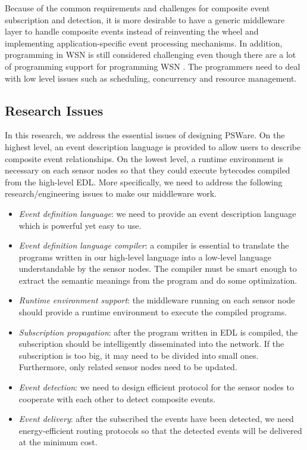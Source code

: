 Because of the common requirements and challenges for composite event subscription and detection, it is more desirable to have a generic middleware layer to handle composite events instead of reinventing the wheel and implementing application-specific event processing mechanisms. In addition, programming in WSN is still considered challenging even though there are a lot of programming support for programming WSN \cite{nesc}. The programmers need to deal with low level issues such as scheduling, concurrency and resource management. 

\subsection{Research Issues}
In this research, we address the essential issues of designing PSWare. On the highest level, an event description language is provided to allow users to describe composite event relationships. On the lowest level, a runtime environment is necessary on each sensor nodes so that they could execute bytecodes compiled from the high-level EDL. More specifically, we need to address the following research/engineering issues to make our middleware work.

\begin{itemize}
\item	\emph{Event definition language}: we need to provide an event description language which is powerful yet easy to use.
\item	\emph{Event definition language compiler}: a compiler is essential to translate the programs written in our high-level language into a low-level language understandable by the sensor nodes. The compiler must be smart enough to extract the semantic meanings from the program and do some optimization.
\item	\emph{Runtime environment support}: the middleware running on each sensor node should provide a runtime environment to execute the compiled programs.
\item	\emph{Subscription propagation}: after the program written in EDL is compiled, the subscription should be intelligently disseminated into the network. If the subscription is too big, it may need to be divided into small ones. Furthermore, only related sensor nodes need to be updated.
\item	\emph{Event detection}: we need to design efficient protocol for the sensor nodes to cooperate with each other to detect composite events.
\item	\emph{Event delivery}: after the subscribed the events have been detected, we need energy-efficient routing protocols so that the detected events will be delivered at the minimum cost.
\end{itemize}